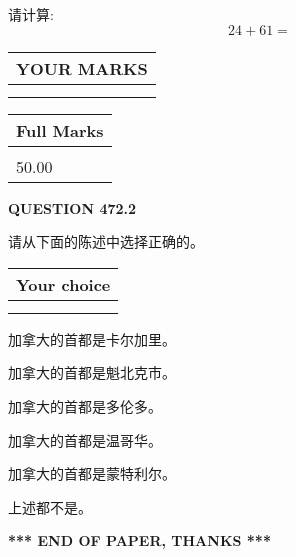 \documentclass{ctexart}
\begin{document}
  
 
请计算:
\begin{equation}
24 +  %
61 = \nonumber
\end{equation}
 

 

 
  
\vspace{0.2in}
  
\noindent\begin{tabular}{|l|}
\hline
 YOUR MARKS  \\
\hline
 \\ 
 \\ 
\hline
\end{tabular}
\hspace{0.05in} \begin{tabular}{|l|}
\hline
 Full Marks  \\
\hline
 \\ 
50.00 \\
\hline
\end{tabular}
{\textbf{\Large{QUESTION
472.2 
}}}
  
  
请从下面的陈述中选择正确的。
  
  
\noindent\hspace{3.0in} \begin{tabular}{|l|}
\hline
Your choice \\
\hline
 \\ 
 \\ 
\hline
\end{tabular}
  
  
 
 
加拿大的首都是卡尔加里。
 
 
加拿大的首都是魁北克市。
 
 
加拿大的首都是多伦多。
 
 
加拿大的首都是温哥华。
 
 
加拿大的首都是蒙特利尔。
 
 
 上述都不是。
 
 
   
   
 \vspace{0.2in}
 
   
   
   
   
\vspace{1.0in} 
{\textbf{\large{ *** END OF PAPER, THANKS *** }}} 
   
\end{document}
